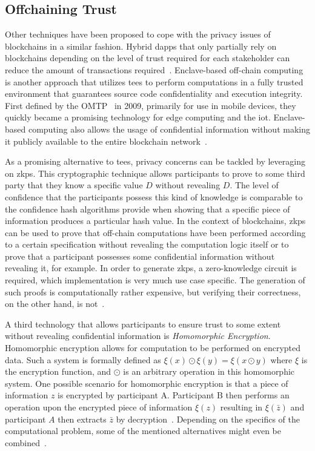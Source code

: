 \subsection{Offchaining Trust}
\label{sec:background:on_vs_off_chain:offchaining_trust}
Other techniques have been proposed to cope with the privacy issues of blockchains in a similar fashion. Hybrid \glspl{dapp} that only partially rely on blockchains depending on the level of trust required for each stakeholder can reduce the amount of transactions required~\cite{how_much_blockchain_do_you_need}. Enclave-based off-chain computing is another approach that utilizes \glspl{tee} to perform computations in a fully trusted environment that guarantees source code confidentiality and execution integrity. First defined by the OMTP~\cite{omtp09_tee_spec} in 2009, primarily for use in mobile devices, they quickly became a promising technology for edge computing and the \gls{iot}. Enclave-based computing also allows the usage of confidential information without making it publicly available to the entire blockchain network~\cite{fu21_tee_for_iot}.

As a promising alternative to \glspl{tee}, privacy concerns can be tackled by leveraging on \glspl{zkp}. This cryptographic technique allows participants to prove to some third party that they know a specific value $D$ without revealing $D$. The level of confidence that the participants possess this kind of knowledge is comparable to the confidence hash algorithms provide when showing that a specific piece of information produces a particular hash value. In the context of blockchains, \glspl{zkp} can be used to prove that off-chain computations have been performed according to a certain specification without revealing the computation logic itself or to prove that a participant possesses some confidential information without revealing it, for example. In order to generate \glspl{zkp}, a zero-knowledge circuit is required, which implementation is very much use case specific. The generation of such proofs is computationally rather expensive, but verifying their correctness, on the other hand, is not~\cite{sun2021_survey_of_zkp_on_blockchain}.

A third technology that allows participants to ensure trust to some extent without revealing confidential information is \textit{Homomorphic Encryption}. Homomorphic encryption allows for computation to be performed on encrypted data. Such a system is formally defined as $\xi(x) \odot \xi(y) = \xi(x \odot y)$ where $\xi$ is the encryption function, and $\odot$ is an arbitrary operation in this homomorphic system. One possible scenario for homomorphic encryption is that a piece of information $z$ is encrypted by participant A. Participant B then performs an operation upon the encrypted piece of information $\xi(z)$ resulting in $\xi(\bar{z})$ and participant $A$ then extracts $\bar{z}$ by decryption~\cite{jayabal20_blockchain_centered_homomorphic_encryption}. Depending on the specifics of the computational problem, some of the mentioned alternatives might even be combined~\cite{eberhardt18off_model_approac_off_comput}.


